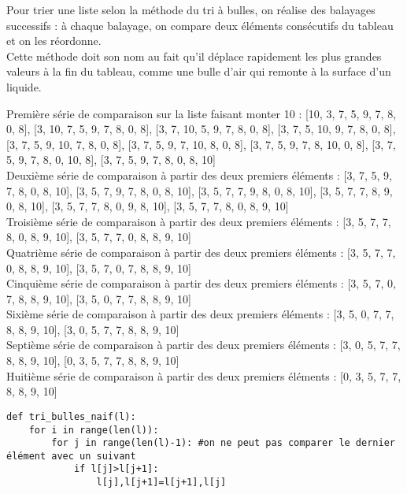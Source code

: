 \setcounter{numques}{0}
Pour trier une liste selon la méthode du tri à bulles, on réalise des balayages successifs : à chaque balayage, on compare deux éléments consécutifs du tableau et on les réordonne.\\
Cette méthode doit son nom au fait qu'il déplace rapidement les plus grandes valeurs à la fin du tableau, comme une bulle d'air qui remonte à la surface d'un liquide.


\ifprof
Première série de comparaison sur la liste faisant monter 10 : 
[10, 3, 7, 5, 9, 7, 8, 0, 8],
[3, 10, 7, 5, 9, 7, 8, 0, 8],
[3, 7, 10, 5, 9, 7, 8, 0, 8],
[3, 7, 5, 10, 9, 7, 8, 0, 8],
[3, 7, 5, 9, 10, 7, 8, 0, 8],
[3, 7, 5, 9, 7, 10, 8, 0, 8],
[3, 7, 5, 9, 7, 8, 10, 0, 8],
[3, 7, 5, 9, 7, 8, 0, 10, 8],
[3, 7, 5, 9, 7, 8, 0, 8, 10]\\
Deuxième série de comparaison à partir des deux premiers éléments :
[3, 7, 5, 9, 7, 8, 0, 8, 10],
[3, 5, 7, 9, 7, 8, 0, 8, 10],
[3, 5, 7, 7, 9, 8, 0, 8, 10],
[3, 5, 7, 7, 8, 9, 0, 8, 10],
[3, 5, 7, 7, 8, 0, 9, 8, 10],
[3, 5, 7, 7, 8, 0, 8, 9, 10]\\
Troisième série de comparaison à partir des deux premiers éléments :
[3, 5, 7, 7, 8, 0, 8, 9, 10],
[3, 5, 7, 7, 0, 8, 8, 9, 10]\\
Quatrième série de comparaison à partir des deux premiers éléments :
[3, 5, 7, 7, 0, 8, 8, 9, 10],
[3, 5, 7, 0, 7, 8, 8, 9, 10]\\
Cinquième série de comparaison à partir des deux premiers éléments :
[3, 5, 7, 0, 7, 8, 8, 9, 10],
[3, 5, 0, 7, 7, 8, 8, 9, 10]\\
Sixième série de comparaison à partir des deux premiers éléments :
[3, 5, 0, 7, 7, 8, 8, 9, 10],
[3, 0, 5, 7, 7, 8, 8, 9, 10]\\
Septième série de comparaison à partir des deux premiers éléments :
[3, 0, 5, 7, 7, 8, 8, 9, 10],
[0, 3, 5, 7, 7, 8, 8, 9, 10]\\
Huitième série de comparaison à partir des deux premiers éléments :
[0, 3, 5, 7, 7, 8, 8, 9, 10]
\else\fi

\ifprof
\begin{lstlisting}
def tri_bulles_naif(l):
    for i in range(len(l)):
        for j in range(len(l)-1): #on ne peut pas comparer le dernier élément avec un suivant
            if l[j]>l[j+1]:
                l[j],l[j+1]=l[j+1],l[j]
\end{lstlisting}
\else\fi

